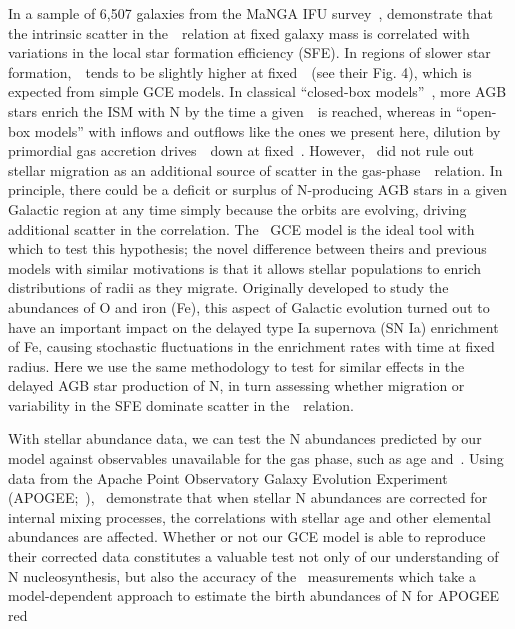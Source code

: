 \documentclass[ms.tex]{subfiles}
\begin{document}
In a sample of 6,507 galaxies from the MaNGA IFU survey~\citep{Bundy2015},
\citet{Schaefer2020} demonstrate that the intrinsic scatter in
the~\ohno~relation at fixed galaxy mass is correlated with variations in the
local star formation efficiency (SFE).
In regions of slower star formation,~\no~tends to be slightly higher at
fixed~\oh~(see their Fig. 4), which is expected from simple GCE models.
In classical ``closed-box models''~\citep[e.g.][]{Molla2006}, more AGB stars
enrich the ISM with N by the time a given~\oh~is reached, whereas in ``open-box
models'' with inflows and outflows like the ones we present here, dilution by
primordial gas accretion drives~\oh~down at fixed~\no.
However,~\citet{Schaefer2020} did not rule out stellar migration as an
additional source of scatter in the gas-phase~\ohno~relation.
In principle, there could be a deficit or surplus of N-producing AGB stars in a
given Galactic region at any time simply because the orbits are evolving,
driving additional scatter in the correlation.
The~\citet{Johnson2021} GCE model is the ideal tool with which to test this
hypothesis; the novel difference between theirs and previous models with
similar motivations is that it allows stellar populations to enrich
distributions of radii as they migrate.
Originally developed to study the abundances of O and iron (Fe), this aspect of
Galactic evolution turned out to have an important impact on the delayed type
Ia supernova (SN Ia) enrichment of Fe, causing stochastic fluctuations in the
enrichment rates with time at fixed radius.
Here we use the same methodology to test for similar effects in the delayed AGB
star production of N, in turn assessing whether migration or variability in the
SFE dominate scatter in the~\ohno~relation.
\par
With stellar abundance data, we can test the N abundances predicted by our
model against observables unavailable for the gas phase, such as age and~\ofe.
Using data from the Apache Point Observatory Galaxy Evolution Experiment
(APOGEE;~\citealp{Majewski2017}),~\citet{Vincenzo2021} demonstrate that when
stellar N abundances are corrected for internal mixing processes, the
correlations with stellar age and other elemental abundances are affected.
Whether or not our GCE model is able to reproduce their corrected data
constitutes a valuable test not only of our understanding of N nucleosynthesis,
but also the accuracy of the~\citet{Vincenzo2021} measurements which take a
model-dependent approach to estimate the birth abundances of N for APOGEE red
\end{document}
